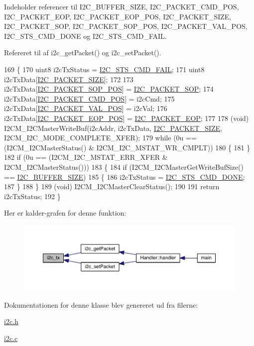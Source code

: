 Indeholder referencer til I2\+C\+\_\+\+B\+U\+F\+F\+E\+R\+\_\+\+S\+I\+ZE, I2\+C\+\_\+\+P\+A\+C\+K\+E\+T\+\_\+\+C\+M\+D\+\_\+\+P\+OS, I2\+C\+\_\+\+P\+A\+C\+K\+E\+T\+\_\+\+E\+OP, I2\+C\+\_\+\+P\+A\+C\+K\+E\+T\+\_\+\+E\+O\+P\+\_\+\+P\+OS, I2\+C\+\_\+\+P\+A\+C\+K\+E\+T\+\_\+\+S\+I\+ZE, I2\+C\+\_\+\+P\+A\+C\+K\+E\+T\+\_\+\+S\+OP, I2\+C\+\_\+\+P\+A\+C\+K\+E\+T\+\_\+\+S\+O\+P\+\_\+\+P\+OS, I2\+C\+\_\+\+P\+A\+C\+K\+E\+T\+\_\+\+V\+A\+L\+\_\+\+P\+OS, I2\+C\+\_\+\+S\+T\+S\+\_\+\+C\+M\+D\+\_\+\+D\+O\+NE og I2\+C\+\_\+\+S\+T\+S\+\_\+\+C\+M\+D\+\_\+\+F\+A\+IL.



Refereret til af i2c\+\_\+get\+Packet() og i2c\+\_\+set\+Packet().


\begin{DoxyCode}
169 \{
170   uint8 i2cTxStatus = \hyperlink{i2c_8h_aee0adbd7dcb13e95337369b7342a27e3}{I2C\_STS\_CMD\_FAIL};
171   uint8 i2cTxData[\hyperlink{i2c_8h_a8c24abf58121f3c16b5f687cc2946cd1}{I2C\_PACKET\_SIZE}];
172   
173   i2cTxData[\hyperlink{i2c_8h_a1207f4b2c3692b1a344f0013da629310}{I2C\_PACKET\_SOP\_POS}] = \hyperlink{i2c_8h_a52bb5b964361ed2f1b18df32c5b8f2c5}{I2C\_PACKET\_SOP};
174   i2cTxData[\hyperlink{i2c_8h_ac13fcfeded7dc2d82fa4734456f3761f}{I2C\_PACKET\_CMD\_POS}] = i2cCmd;
175   i2cTxData[\hyperlink{i2c_8h_a68506c3651f015716bb2c135e8e7b972}{I2C\_PACKET\_VAL\_POS}] = i2cVal;
176   i2cTxData[\hyperlink{i2c_8h_a940f0ea8103872c7ba81b9dc0f121feb}{I2C\_PACKET\_EOP\_POS}] = \hyperlink{i2c_8h_a62b4ae6e51a3d0da47f5165165cdbc0a}{I2C\_PACKET\_EOP};
177   
178   (void) I2CM\_I2CMasterWriteBuf(i2cAddr, i2cTxData, \hyperlink{i2c_8h_a8c24abf58121f3c16b5f687cc2946cd1}{I2C\_PACKET\_SIZE}, 
      I2CM\_I2C\_MODE\_COMPLETE\_XFER);
179   \textcolor{keywordflow}{while} (0u == (I2CM\_I2CMasterStatus() & I2CM\_I2C\_MSTAT\_WR\_CMPLT))
180   \{
181   \}
182   \textcolor{keywordflow}{if} (0u == (I2CM\_I2C\_MSTAT\_ERR\_XFER & I2CM\_I2CMasterStatus()))
183   \{
184     \textcolor{keywordflow}{if} (I2CM\_I2CMasterGetWriteBufSize() == \hyperlink{i2c_8h_a6458dbf193a0eef0470fc1b08400bfcd}{I2C\_BUFFER\_SIZE})
185     \{
186       i2cTxStatus = \hyperlink{i2c_8h_a7f8f53679384fa228bf06779cc168cfd}{I2C\_STS\_CMD\_DONE};
187     \}
188   \}
189   (void) I2CM\_I2CMasterClearStatus();
190   
191   \textcolor{keywordflow}{return} i2cTxStatus;
192 \}
\end{DoxyCode}


Her er kalder-\/grafen for denne funktion\+:\nopagebreak
\begin{figure}[H]
\begin{center}
\leavevmode
\includegraphics[width=350pt]{d4/d47/class_i2_c_a6e8687e512564fb2b0201d5fdbecba65_icgraph}
\end{center}
\end{figure}




Dokumentationen for denne klasse blev genereret ud fra filerne\+:\begin{DoxyCompactItemize}
\item 
\hyperlink{i2c_8h}{i2c.\+h}\item 
\hyperlink{i2c_8c}{i2c.\+c}\end{DoxyCompactItemize}
